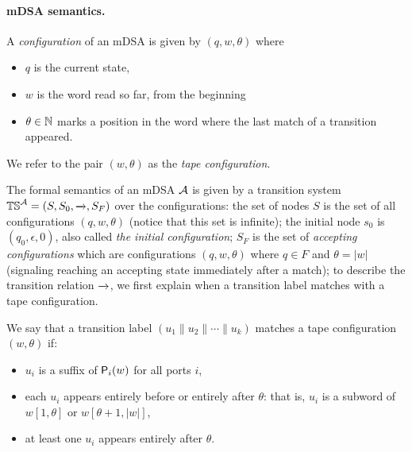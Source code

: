   \paragraph*{mDSA semantics.} A \emph{configuration} of an mDSA is given by $(q, w, \theta)$ where
  \begin{itemize}
  \item $q$ is the current state,
  \item $w$ is the word read so far, from the beginning
  \item $\theta \in \mathbb{N}$ marks a position in the word where the last match of a transition appeared.  
  \end{itemize} 
  We refer to the pair $(w, \theta)$ as the \emph{tape configuration}.
  
  The formal semantics of an mDSA $\mathcal{A}$ is given by a transition system $\mathbb{TS}^{\mathcal{A}} = (S, S_0, \xrightarrow{}, S_F)$  over the configurations: the set of nodes $S$ is  the set of all configurations $(q, w, \theta)$ (notice that this set is infinite); the initial node $s_0$ is $(q_0, \epsilon, 0)$, also called \emph{the initial configuration}; $S_F$  is the set of \emph{accepting configurations} which are configurations $(q, w, \theta)$ where $q \in F$ and $\theta = |w|$ (signaling reaching an accepting state immediately after a match); to describe the transition relation $\xrightarrow{}$, we first explain when a transition label matches with a tape configuration. 

  \begin{definition}\label{def:match}
    We say that a transition label $(u_1 \parallel u_2 \parallel \cdots \parallel u_k)$ matches a tape configuration $(w, \theta)$ if:
    \begin{itemize}
      \item $u_i$ is a suffix of $\mathsf{P}_{i}(w)$ for all ports $i$,
      \item each $u_i$ appears entirely before or entirely after $\theta$: that is, $u_i$ is a subword of $w[1, \theta]$ or $w[\theta+1, |w|]$,
      \item at least one $u_i$ appears entirely after $\theta$.
    \end{itemize}
  \end{definition}


